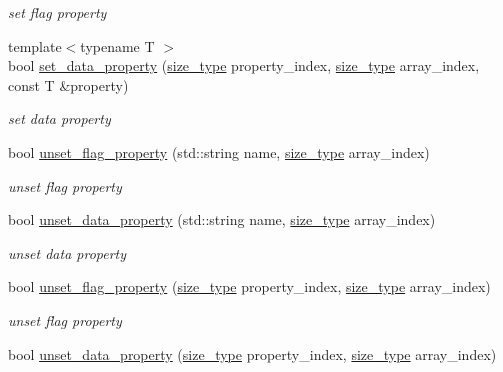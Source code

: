 \begin{DoxyCompactItemize}
\begin{DoxyCompactList}\small\item\em set flag property \end{DoxyCompactList}\item 
{\footnotesize template$<$typename T $>$ }\\bool \hyperlink{classlb_1_1property__array_a06dc407d2cd6d1b42a9e7906501e5c08}{set\-\_\-data\-\_\-property} (\hyperlink{classlb_1_1property__array_a76d861a6fb4b99128f627ad951918429}{size\-\_\-type} property\-\_\-index, \hyperlink{classlb_1_1property__array_a76d861a6fb4b99128f627ad951918429}{size\-\_\-type} array\-\_\-index, const \-T \&property)
\begin{DoxyCompactList}\small\item\em set data property \end{DoxyCompactList}\item 
bool \hyperlink{classlb_1_1property__array_a53a211f3ecf74d917ae98cea5004dd6c}{unset\-\_\-flag\-\_\-property} (std\-::string name, \hyperlink{classlb_1_1property__array_a76d861a6fb4b99128f627ad951918429}{size\-\_\-type} array\-\_\-index)
\begin{DoxyCompactList}\small\item\em unset flag property \end{DoxyCompactList}\item 
bool \hyperlink{classlb_1_1property__array_ad205c8531dcc73d945b1f8129aefea1c}{unset\-\_\-data\-\_\-property} (std\-::string name, \hyperlink{classlb_1_1property__array_a76d861a6fb4b99128f627ad951918429}{size\-\_\-type} array\-\_\-index)
\begin{DoxyCompactList}\small\item\em unset data property \end{DoxyCompactList}\item 
bool \hyperlink{classlb_1_1property__array_a0a6834b52b254c3253162b13df4fa15b}{unset\-\_\-flag\-\_\-property} (\hyperlink{classlb_1_1property__array_a76d861a6fb4b99128f627ad951918429}{size\-\_\-type} property\-\_\-index, \hyperlink{classlb_1_1property__array_a76d861a6fb4b99128f627ad951918429}{size\-\_\-type} array\-\_\-index)
\begin{DoxyCompactList}\small\item\em unset flag property \end{DoxyCompactList}\item 
bool \hyperlink{classlb_1_1property__array_adc794a474d469ad1202b13cf14150721}{unset\-\_\-data\-\_\-property} (\hyperlink{classlb_1_1property__array_a76d861a6fb4b99128f627ad951918429}{size\-\_\-type} property\-\_\-index, \hyperlink{classlb_1_1property__array_a76d861a6fb4b99128f627ad951918429}{size\-\_\-type} array\-\_\-index)

\end{DoxyCompactItemize}
